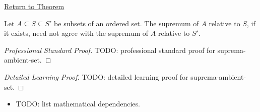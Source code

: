 \newpage
{}
\label{prf:suprema-ambient-set}

\begin{remark*}[Return]
\hyperref[prop:suprema-ambient-set]{Return to Theorem}
\end{remark*}

\begin{theorem*}
Let $A\subseteq S\subseteq S'$ be subsets of an ordered set. The supremum of $A$ relative to $S$, if it exists, need not agree with the supremum of $A$ relative to $S'$.
\end{theorem*}

\begin{proof}[Professional Standard Proof]
\LRAProofBodyStart
TODO: professional standard proof for suprema-ambient-set.
\end{proof}

\begin{proof}[Detailed Learning Proof]
\LRAProofBodyStart
TODO: detailed learning proof for suprema-ambient-set.
\end{proof}

\begin{remark*}
\end{remark*}

\begin{dependencies}
\begin{itemize}
  \item TODO: list mathematical dependencies.
\end{itemize}
\end{dependencies}

\clearpage

